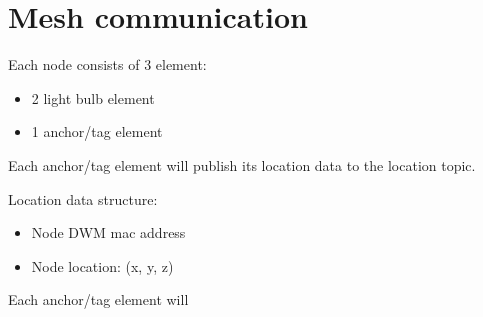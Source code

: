 \documentclass[./main.tex]{subfiles}
\begin{document}
\chapter{Mesh communication}

Each node consists of 3 element:
\begin{itemize}
    \item 2 light bulb element
    \item 1 anchor/tag element
\end{itemize}

Each anchor/tag element will publish its location data to the location topic.

Location data structure:
\begin{itemize}
    \item Node DWM mac address
    \item Node location: (x, y, z)
\end{itemize}

Each anchor/tag element will 
\end{document}
